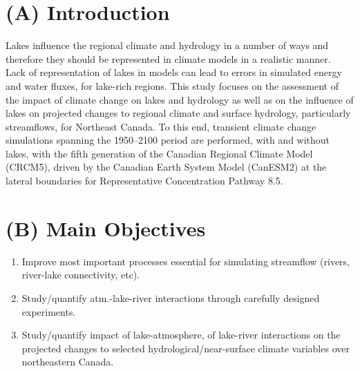 \documentclass[a0,landscape]{a0poster}
\begin{document}
\vspace{0.5cm} %


\begin{multicols}{3} %


\color{SaddleBrown} %

\section*{(A) Introduction}
Lakes influence the regional climate and hydrology in a number of ways and
therefore they should be represented in climate models in a realistic manner.
Lack of representation of lakes in models can lead to errors in simulated energy
and water fluxes, for lake-rich regions. This study focuses on the assessment of
the impact of climate change on lakes and hydrology as well as on the influence
of lakes on projected changes to regional climate and surface hydrology,
particularly streamflows, for Northeast Canada. To this end, transient climate
change simulations spanning the 1950--2100 period are performed, with and without
lakes, with the fifth generation of the Canadian Regional Climate Model (CRCM5),
driven by the Canadian Earth System Model (CanESM2) at the lateral boundaries
for Representative Concentration Pathway 8.5.


\color{DarkSlateGray} %

\section*{(B) Main Objectives}
\begin{tcolorbox}[colback=white,colframe=green!40!black]
  \begin{enumerate}
  \item Improve most important processes essential for simulating streamflow (rivers, river-lake connectivity, etc).
  \item Study/quantify atm.-lake-river interactions through carefully designed experiments.
  \item Study/quantify impact of lake-atmosphere, of lake-river interactions on the projected changes to selected hydrological/near-surface climate variables over northeastern Canada.
  \end{enumerate}
\end{tcolorbox}


\end{multicols}
\end{document}
